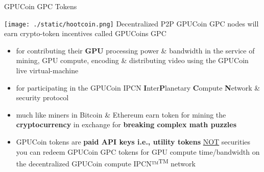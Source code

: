 
\begin{frame}[t]{GPUCoin GPC Tokens }
 
\texttt{[image: ./static/hootcoin.png]} Decentralized P2P	 GPUCoin GPC nodes will earn crypto-token incentives called GPUCoins GPC

 \begin{itemize}[<+-| alert@+>]
 \item for contributing their \textbf{GPU} processing power \& bandwidth in the service of mining, GPU compute, encoding \& distributing video using the GPUCoin live virtual-machine 
 \item for participating in the GPUCoin IPCN \textbf{I}nter\textbf{P}lanetary \textbf{C}ompute \textbf{N}etwork \& security protocol
 \item much like miners in Bitcoin \& Ethereum earn token for mining the \textbf{cryptocurrency} in exchange for \textbf{breaking complex math puzzles}
 \item GPUCoin tokens are \textbf{paid API keys i.e., utility tokens} \underline{NOT} securities you can redeem GPUCoin GPC tokens for GPU compute time/bandwidth on the decentralized GPUCoin compute IPCN™\textsuperscript{TM} network
 \end{itemize}
 
\end{frame}